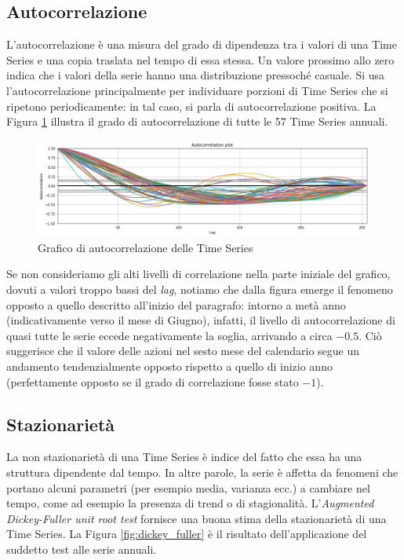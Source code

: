 \documentclass[a4paper]{article}
\begin{document}
\subsection{Autocorrelazione}

L'autocorrelazione è una misura del grado di dipendenza tra i valori di una Time Series e una copia traslata nel tempo di essa stessa. Un valore prossimo allo zero indica che i valori della serie hanno una distribuzione pressoché casuale. Si usa l'autocorrelazione principalmente per individuare porzioni di Time Series che si ripetono periodicamente: in tal caso, si parla di autocorrelazione positiva. La Figura \ref{fig:autocorr_plot} illustra il grado di autocorrelazione di tutte le 57 Time Series annuali.

\begin{figure}[h]
	\includegraphics[width=\textwidth]{images/autocorrelation_plot.png}
	\caption{Grafico di autocorrelazione delle Time Series}
	\label{fig:autocorr_plot}
\end{figure}

\noindent
Se non consideriamo gli alti livelli di correlazione nella parte iniziale del grafico, dovuti a valori troppo bassi del \textit{lag}, notiamo che dalla figura emerge il fenomeno opposto a quello descritto all'inizio del paragrafo: intorno a metà anno (indicativamente verso il mese di Giugno), infatti, il livello di autocorrelazione di quasi tutte le serie eccede negativamente la soglia, arrivando a circa $-0.5$. Ciò suggerisce che il valore delle azioni nel sesto mese del calendario segue un andamento tendenzialmente opposto rispetto a quello di inizio anno (perfettamente opposto se il grado di correlazione fosse stato $-1$).



\subsection{Stazionarietà}

La non stazionarietà di una Time Series è indice del fatto che essa ha una struttura dipendente dal tempo. In altre parole, la serie è affetta da fenomeni che portano alcuni parametri (per esempio media, varianza ecc.) a cambiare nel tempo, come ad esempio la presenza di trend o di stagionalità. L'\textit{Augmented Dickey-Fuller unit root test} fornisce una buona stima della stazionarietà di una Time Series. La Figura \ref{fig:dickey_fuller} è il risultato dell'applicazione del suddetto test alle serie annuali.
\end{document}
